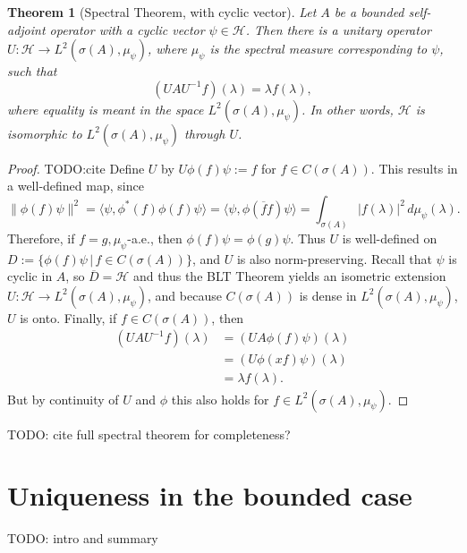 \documentclass[12pt,oneside]{report}
\newtheorem{thm}{Theorem}[chapter]
\begin{document}
\begin{thm}[Spectral Theorem, with cyclic vector]\label{spectral-mo}
    Let $A$ be a bounded self-adjoint operator with a cyclic vector $\psi \in \mathscr{H}$. Then there is a unitary operator $U: \mathscr{H} \to L^{2}(\sigma(A),\mu_{\psi})$, where $\mu_{\psi}$ is the spectral measure corresponding to $\psi$, such that $$(UAU^{-1}f)(\lambda) = \lambda f(\lambda),$$where equality is meant in the space $L^{2}(\sigma(A),\mu_{\psi})$. In other words, $\mathscr{H}$ is isomorphic to $L^2(\sigma(A),\mu_\psi)$ through $U$.
\end{thm}
\begin{proof}
    TODO:cite Define $U$ by $U\phi(f)\psi := f$ for $f \in C(\sigma(A))$. This results in a well-defined map, since $$\|\phi(f)\psi\|^{2} = \langle \psi, \phi^{*}(f)\phi(f)\psi \rangle = \langle \psi, \phi(\overline{f}f)\psi \rangle = \int _{\sigma(A)} |f(\lambda)|^{2} \, d\mu_{\psi}(\lambda).$$ Therefore, if $f=g, \mu_{\psi}$-a.e., then $\phi(f)\psi = \phi(g)\psi$. Thus $U$ is well-defined on $D := \{ \phi(f)\psi \, | \, f \in C(\sigma(A)) \}$, and $U$ is also norm-preserving. Recall that $\psi$ is cyclic in $A$, so $\overline{D} = \mathscr{H}$ and thus the BLT Theorem yields an isometric extension $U: \mathscr{H} \to L^{2}(\sigma(A), \mu_{\psi})$, and because $C(\sigma(A))$ is dense in $L^{2}(\sigma(A),\mu_{\psi})$, $U$ is onto. Finally, if $f \in C(\sigma(A))$, then \begin{align*}
        (UAU^{-1}f)(\lambda) &= (UA\phi(f)\psi)(\lambda) \\
        &= (U\phi(xf)\psi)(\lambda) \\
        &= \lambda f(\lambda).
    \end{align*} But by continuity of $U$ and $\phi$ this also holds for $f \in L^{2}(\sigma(A),\mu_{\psi})$.
\end{proof}

TODO: cite full spectral theorem for completeness?

\chapter{Uniqueness in the bounded case}

TODO: intro and summary
\end{document}
